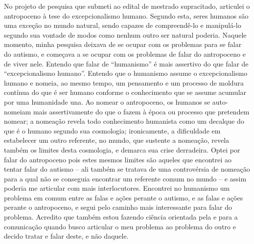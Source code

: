 No projeto de pesquisa que submeti ao edital de mestrado supracitado, articulei o antropoceno à tese do excepcionalismo humano. Segundo esta, seres humanos são uma exceção no mundo natural, sendo capazes de compreendê-lo e manipulá-lo segundo sua vontade de modos como nenhum outro ser natural poderia. Naquele momento, minha pesquisa deixava de se ocupar com os problemas para se falar do autismo, e começava a se ocupar com os problemas de falar do antropoceno e de viver nele.
Entendo que falar de \enquote{humanismo} é mais assertivo do que falar de \enquote{excepcionalismo humano}. Entendo que o humanismo assume o excepcionalismo humano e nomeia, ao mesmo tempo, um pensamento e um processo de moldura contínua do que é ser humano conforme o conhecimento que se assume acumular por uma humanidade una. Ao nomear o antropoceno, os humanos se auto-nomeiam mais assertivamente do que o fazem à época ou processo que pretendem nomear; a nomeação revela todo conhecimento humanista como um decalque do que é o humano segundo sua cosmologia; ironicamente, a dificuldade em estabelecer um outro referente, no mundo, que sustente a nomeação, revela também os limites desta cosmologia, e demarca sua crise derradeira.
Optei por falar do antropoceno pois estes mesmos limites são aqueles que encontrei ao tentar falar do autismo -- ali também se tratava de uma controvérsia de nomeação para a qual não se conseguia encontrar um referente comum no mundo -- e assim poderia me articular com mais interlocutores. Encontrei no humanismo um problema em comum entre as falas e ações perante o autismo, e as falas e ações perante o antropoceno, e segui pelo caminho mais interessante para falar do problema. Acredito que também estou fazendo ciência orientada pela e para a comunicação quando busco articular o meu problema ao problema do outro e decido tratar e falar deste, e não daquele.